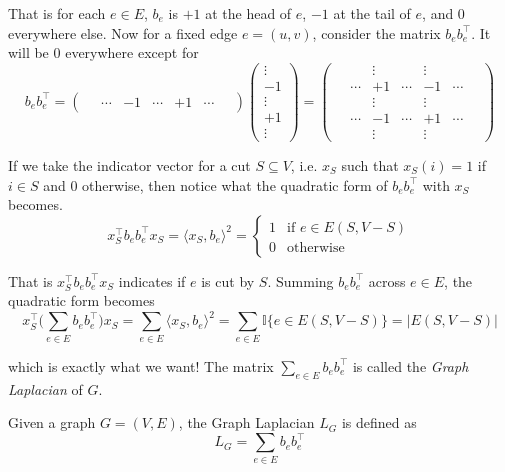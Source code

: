 That is for each $e \in E$, $b_e$ is $+1$ at the head of $e$, $-1$ at the tail of $e$, and 0 everywhere else. Now for a fixed edge $e = (u, v)$, consider the matrix $b_e b_e^\top$. It will be 0 everywhere except for
\begin{equation*}
b_e b_e^\top 
= \begin{pmatrix}
\quad\cdots & -1 & \cdots & +1 & \cdots\quad 
\end{pmatrix}
\begin{pmatrix}
\vdots \\ -1 \\ \vdots \\ +1 \\ \vdots
\end{pmatrix}
= \begin{pmatrix}
  & \vdots & & \vdots & \\
  \quad\cdots & +1 & \cdots & -1 & \cdots\quad \\
  & \vdots & & \vdots & \\
  \quad\cdots & -1 & \cdots & +1 & \cdots\quad \\
  & \vdots & & \vdots &
\end{pmatrix}
\end{equation*}

If we take the indicator vector for a cut $S \subseteq V$, i.e. $x_S$ such that $x_S(i) = 1$ if $i \in S$ and 0 otherwise, then notice what the quadratic form of $b_e b_e^\top$ with $x_S$ becomes.
\begin{equation*}
x_S^\top b_e b_e^\top x_S
= \langle x_S, b_e \rangle^2
= \begin{cases}
  1 & \text{if } e \in E(S, V - S) \\
  0 & \text{otherwise}
\end{cases}
\end{equation*}

That is $x_S^\top b_e b_e^\top x_S$ indicates if $e$ is cut by $S$. Summing $b_e b_e^\top$ across $e \in E$, the quadratic form becomes
\begin{equation*}
x_S^\top \bigg( \sum_{e \in E} b_e b_e^\top \bigg) x_S 
= \sum_{e \in E} \langle x_S, b_e \rangle^2
= \sum_{e \in E} \mathbb{I} \{ e \in E(S, V - S) \}
= \lvert E(S, V - S) \rvert
\end{equation*}

which is exactly what we want! The matrix $\sum_{e \in E} b_e b_e^\top$ is called the \emph{Graph Laplacian} of $G$.
\begin{definition} Given a graph $G = (V, E)$, the Graph Laplacian $L_G$ is defined as
\begin{equation*}
L_G = \sum_{e \in E} b_e b_e^\top 
\end{equation*}
\end{definition}

